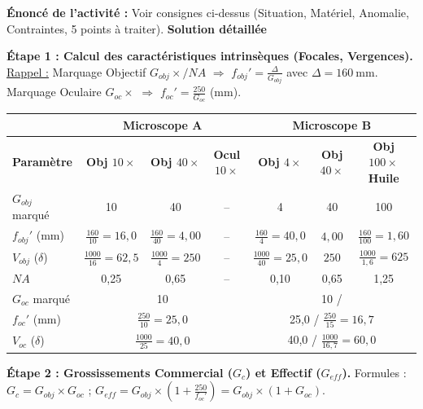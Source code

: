 \documentclass[11pt]{article}
\begin{document}
\begin{exoresolu}
\textbf{Énoncé de l'activité :} Voir consignes ci-dessus (Situation, Matériel, Anomalie, Contraintes, 5 points à traiter).
\tcblower
\textbf{Solution détaillée}

\medskip
\noindent \textbf{Étape 1 : Calcul des caractéristiques intrinsèques (Focales, Vergences).}
\medskip
\noindent \underline{Rappel :} Marquage Objectif $G_{obj}\times / NA$ $\Rightarrow$ $f_{obj}' = \frac{\Delta}{G_{obj}}$ avec $\Delta = \SI{160}{\mm}$.
Marquage Oculaire $G_{oc}\times$ $\Rightarrow$ $f_{oc}' = \frac{250}{G_{oc}}$ (mm).

\begin{center}
\begin{tabular}{|l|ccc|ccc|}\hline
 & \multicolumn{3}{c|}{\textbf{Microscope A}} & \multicolumn{3}{c|}{\textbf{Microscope B}} \\ \hline
\textbf{Paramètre} & \textbf{Obj $10\times$} & \textbf{Obj $40\times$} & \textbf{Ocul $10\times$} & \textbf{Obj $4\times$} & \textbf{Obj $40\times$} & \textbf{Obj $100\times$ Huile} \\ \hline
$G_{obj}$ marqué & 10 & 40 & -- & 4 & 40 & 100 \\
$f_{obj}'$ (mm) & $\frac{160}{10}=16,0$ & $\frac{160}{40}=4,00$ & -- & $\frac{160}{4}=40,0$ & $4,00$ & $\frac{160}{100}=1,60$ \\
$V_{obj}$ ($\delta$) & $\frac{1000}{16}=62,5$ & $\frac{1000}{4}=250$ & -- & $\frac{1000}{40}=25,0$ & $250$ & $\frac{1000}{1,6}=625$ \\
$NA$ & 0,25 & 0,65 & -- & 0,10 & 0,65 & 1,25 \\ \hline
$G_{oc}$ marqué & \multicolumn{3}{c|}{10} & \multicolumn{3}{c|}{10 \quad / \quad 15} \\ \hline
$f_{oc}'$ (mm) & \multicolumn{3}{c|}{$\frac{250}{10}=25,0$} & \multicolumn{3}{c|}{25,0 \quad / \quad $\frac{250}{15}=16,7$} \\
$V_{oc}$ ($\delta$) & \multicolumn{3}{c|}{$\frac{1000}{25}=40,0$} & \multicolumn{3}{c|}{40,0 \quad / \quad $\frac{1000}{16,7}=60,0$} \\ \hline
\end{tabular}
\end{center}

\medskip
\noindent \textbf{Étape 2 : Grossissements Commercial ($G_c$) et Effectif ($G_{eff}$).}
\medskip
\noindent Formules : $G_c = G_{obj} \times G_{oc}$ ; $G_{eff} = G_{obj} \times \left(1 + \frac{250}{f_{oc}'}\right) = G_{obj} \times (1 + G_{oc})$.


\end{exoresolu}
\end{document}
